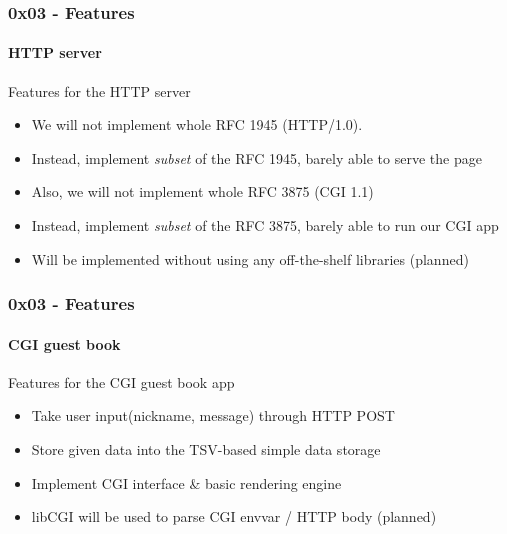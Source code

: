 \documentclass {beamer}
\begin{document}
\begin{frame}
  \frametitle{0x03 - Features}
  \framesubtitle{HTTP server}

  Features for the HTTP server

  \begin{itemize}
    \item<1-> We will not implement whole RFC 1945 (HTTP/1.0).
    \item<2-> Instead, implement \textit{subset} of the RFC 1945, barely able to serve the page
    \item<3-> Also, we will not implement whole RFC 3875 (CGI 1.1)
    \item<4-> Instead, implement \textit{subset} of the RFC 3875, barely able to run our CGI app
    \item<5-> Will be implemented without using any off-the-shelf libraries (planned)
  \end{itemize}
\end{frame}

\begin{frame}
  \frametitle{0x03 - Features}
  \framesubtitle{CGI guest book}

  Features for the CGI guest book app
  \begin{itemize}
    \item<1-> Take user input(nickname, message) through HTTP POST
    \item<2-> Store given data into the TSV-based simple data storage
    \item<3-> Implement CGI interface \& basic rendering engine
    \item<3-> libCGI will be used to parse CGI envvar / HTTP body (planned)
  \end{itemize}
\end{frame}
\end{document}
